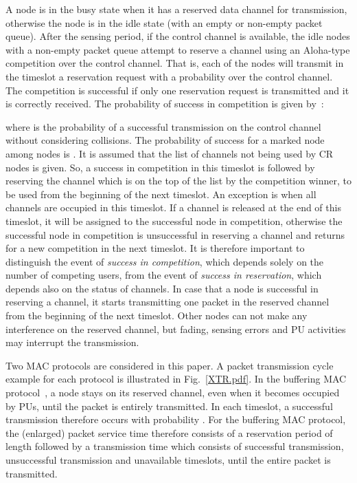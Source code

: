 \documentclass[12pt,journal,oneside,onecolumn]{IEEEtran}
\begin{document}
A node is in the busy state when it has a reserved data channel for transmission, otherwise the node is in the idle state (with an empty or non-empty packet queue). After the sensing period, if the control channel is available, the  idle nodes with a non-empty packet queue attempt to reserve a channel using an Aloha-type competition over the control channel. That is, each of the  nodes will transmit in the timeslot a reservation request with a probability  over the control channel. The competition is successful if only one reservation request is transmitted and it is correctly received.
The probability of success in competition is given by~\cite{pawelczak09}:

where  is the probability of a successful transmission on the control channel without considering collisions. The probability of success for a marked node among  nodes is . 
It is assumed that the list of channels not being used by  CR nodes is given. So, a success in competition in this timeslot is followed by reserving the channel which is on the top of the list by the competition winner, to be used from the beginning of the next timeslot. An exception is when all channels are occupied in this timeslot. If a channel is released at the end of this timeslot, it will be assigned to the successful node in competition, otherwise the successful node in competition is unsuccessful in reserving a channel and returns for a new competition in the next timeslot. It is therefore important to distinguish the event of \emph{success in competition}, which depends solely on the number of competing users, from the event of \emph{success in reservation}, which depends also on the status of channels.
In case that a node is successful in reserving a channel, it starts transmitting one packet in the reserved channel from the beginning of the next timeslot. Other nodes can not make any interference on the reserved channel, but fading, sensing errors and PU activities may interrupt the transmission.

Two MAC protocols are considered in this paper. A  packet transmission cycle example for each protocol is illustrated in Fig.~\ref{XTR.pdf}. In the buffering MAC protocol~\cite{pawelczak09}, 
a node stays on its reserved channel, even when it becomes occupied by PUs, until the packet is entirely transmitted. 
In each timeslot, a successful transmission therefore occurs with probability . 
For the buffering MAC protocol, the (enlarged) packet service time  therefore consists of a reservation period of length  
followed by a transmission time  which consists of successful transmission, 
unsuccessful transmission and unavailable timeslots, until the entire packet is transmitted.
\end{document}

